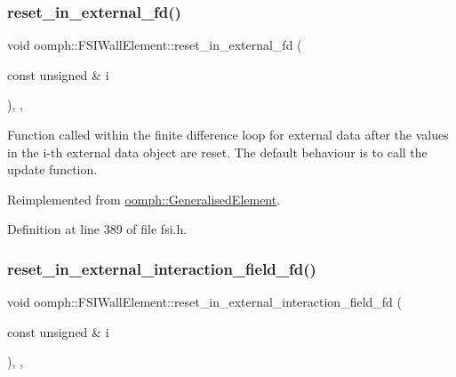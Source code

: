 \subsubsection{\texorpdfstring{reset\+\_\+in\+\_\+external\+\_\+fd()}{reset\_in\_external\_fd()}}
{\footnotesize\ttfamily void oomph\+::\+F\+S\+I\+Wall\+Element\+::reset\+\_\+in\+\_\+external\+\_\+fd (\begin{DoxyParamCaption}\item[{const unsigned \&}]{i }\end{DoxyParamCaption})\hspace{0.3cm}{\ttfamily [inline]}, {\ttfamily [protected]}, {\ttfamily [virtual]}}



Function called within the finite difference loop for external data after the values in the i-\/th external data object are reset. The default behaviour is to call the update function. 



Reimplemented from \hyperlink{classoomph_1_1GeneralisedElement_a027a9213e91b946346062adf96e26a85}{oomph\+::\+Generalised\+Element}.



Definition at line 389 of file fsi.\+h.

\mbox{\label{classoomph_1_1FSIWallElement_adc6d07122f1624e2b66ce1a12b530e27}} 
\subsubsection{\texorpdfstring{reset\+\_\+in\+\_\+external\+\_\+interaction\+\_\+field\+\_\+fd()}{reset\_in\_external\_interaction\_field\_fd()}}
{\footnotesize\ttfamily void oomph\+::\+F\+S\+I\+Wall\+Element\+::reset\+\_\+in\+\_\+external\+\_\+interaction\+\_\+field\+\_\+fd (\begin{DoxyParamCaption}\item[{const unsigned \&}]{i }\end{DoxyParamCaption})\hspace{0.3cm}{\ttfamily [inline]}, {\ttfamily [protected]}, {\ttfamily [virtual]}}



